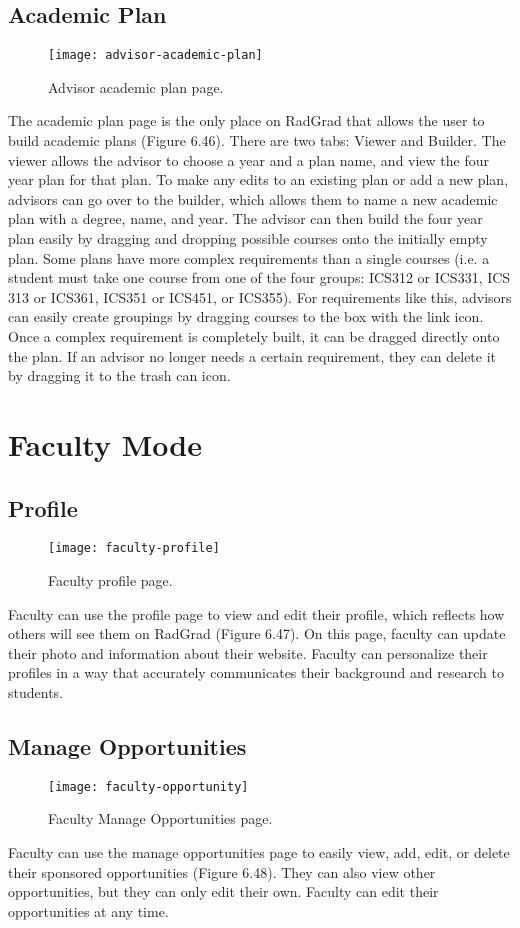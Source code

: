 \subsection{Academic Plan}
\begin{figure}[htbp!]
\centering
\texttt{[image: advisor-academic-plan]}
\caption{Advisor academic plan page.}
\end{figure}
The academic plan page is the only place on RadGrad that allows the user to build academic plans (Figure 6.46). There are two tabs: Viewer and Builder. The viewer allows the advisor to choose a year and a plan name, and view the four year plan for that plan. To make any edits to an existing plan or add a new plan, advisors can go over to the builder, which allows them to name a new academic plan with a degree, name, and year. The advisor can then build the four year plan easily by dragging and dropping possible courses onto the initially empty plan. Some plans have more complex requirements than a single courses (i.e. a student must take one course from one of the four groups: ICS312 or ICS331, ICS 313 or ICS361, ICS351 or ICS451, or ICS355). For requirements like this, advisors can easily create groupings by dragging courses to the box with the link icon. Once a complex requirement is completely built, it can be dragged directly onto the plan. If an advisor no longer needs a certain requirement, they can delete it by dragging it to the trash can icon. 

\section{Faculty Mode}
\subsection{Profile}
\begin{figure}[htbp!]
\centering
\texttt{[image: faculty-profile]}
\caption{Faculty profile page.}
\end{figure}
Faculty can use the profile page to view and edit their profile, which reflects how others will see them on RadGrad (Figure 6.47). On this page, faculty can update their photo and information about their website. Faculty can personalize their profiles in a way that accurately communicates their background and research to students. 
\subsection{Manage Opportunities}
\begin{figure}[htbp!]
\centering
\texttt{[image: faculty-opportunity]}
\caption{Faculty Manage Opportunities page.}
\end{figure}
Faculty can use the manage opportunities page to easily view, add, edit, or delete their sponsored opportunities (Figure 6.48). They can also view other opportunities, but they can only edit their own. Faculty can edit their opportunities at any time.
